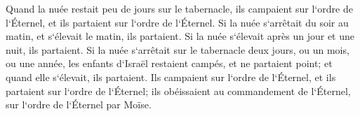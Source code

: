 \verse Quand la nuée restait peu de jours sur le tabernacle, ils campaient sur l`ordre de l`Éternel, et ils partaient sur l`ordre de l`Éternel. 
\verse Si la nuée s`arrêtait du soir au matin, et s`élevait le matin, ils partaient. Si la nuée s`élevait après un jour et une nuit, ils partaient. 
\verse Si la nuée s`arrêtait sur le tabernacle deux jours, ou un mois, ou une année, les enfants d`Israël restaient campés, et ne partaient point; et quand elle s`élevait, ils partaient. 
\verse Ils campaient sur l`ordre de l`Éternel, et ils partaient sur l`ordre de l`Éternel; ils obéissaient au commandement de l`Éternel, sur l`ordre de l`Éternel par Moïse. 

\chapter{}

